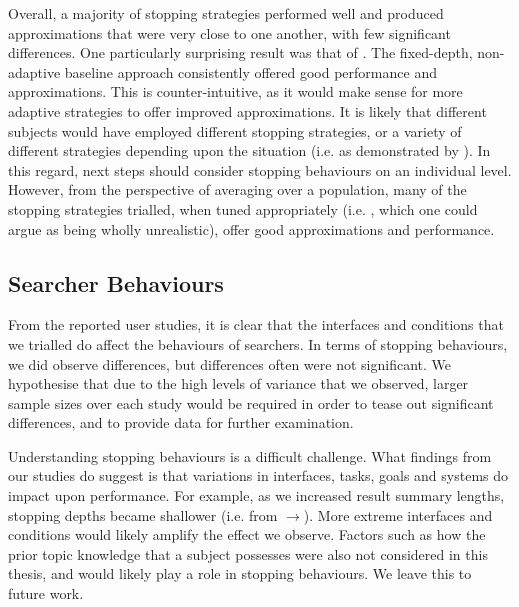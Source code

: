Overall, a majority of stopping strategies performed well and produced approximations that were very close to one another, with few significant differences. One particularly surprising result was that of . The fixed-depth, non-adaptive baseline approach consistently offered good performance and approximations. This is counter-intuitive, as it would make sense for more adaptive strategies to offer improved approximations. It is likely that different subjects would have employed different stopping strategies, or a variety of different strategies depending upon the situation (i.e. as demonstrated by ). In this regard, next steps should consider stopping behaviours on an individual level. However, from the perspective of averaging over a population, many of the stopping strategies trialled, when tuned appropriately (i.e. , which one could argue as being wholly unrealistic), offer good approximations and performance.

\subsection{Searcher Behaviours}\label{sec:conclusions:discussion:behaviours}
From the reported user studies, it is clear that the interfaces and conditions that we trialled do affect the behaviours of searchers. In terms of stopping behaviours, we did observe differences, but differences often were not significant. We hypothesise that due to the high levels of variance that we observed, larger sample sizes over each study would be required in order to tease out significant differences, and to provide data for further examination.

Understanding stopping behaviours is a difficult challenge. What findings from our studies do suggest is that variations in interfaces, tasks, goals and systems do impact upon performance. For example, as we increased result summary lengths, stopping depths became shallower (i.e. from $\rightarrow$). More extreme interfaces and conditions would likely amplify the effect we observe. Factors such as how the prior topic knowledge that a subject possesses were also not considered in this thesis, and would likely play a role in stopping behaviours. We leave this to future work.

